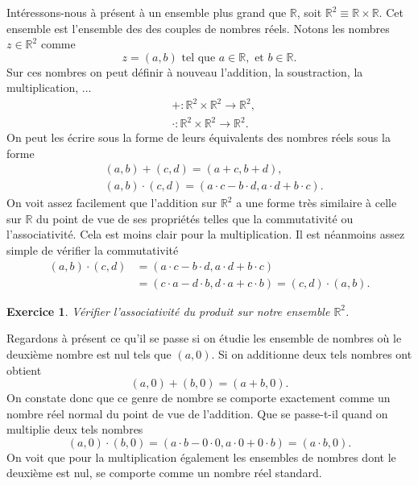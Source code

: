 \documentclass[a4paper,12pt]{book}
\newcommand{\real}{\mathbb{R}}
\newtheorem*{exercice}{Exercice}
\begin{document}
Intéressons-nous à présent à un ensemble plus grand que $\real$, soit $\real^2\equiv\real\times\real$. Cet ensemble est l'ensemble des
des couples de nombres réels. Notons les nombres $z\in\real^2$ comme 
\begin{equation}
 z=(a,b)\mbox{ tel que } a\in\real, \mbox{ et } b\in\real.
\end{equation}
Sur ces nombres on peut définir à nouveau l'addition, la soustraction, la multiplication, ...
\begin{align}
& +:\real^2\times\real^2\rightarrow\real^2,\\
& \cdot:\real^2\times\real^2\rightarrow\real^2.
\end{align}
On peut les écrire sous la forme de leurs équivalents des nombres réels sous la forme
\begin{align}
&(a,b)+(c,d)=(a+c,b+d),\label{eq_add}\\
&(a,b)\cdot(c,d)=(a\cdot c-b\cdot d,a\cdot d+b\cdot c).\label{eq_mult}
\end{align}
On voit assez facilement que l'addition sur $\real^2$ a une forme très similaire 
à celle sur $\real$ du point de vue de ses propriétés telles que la commutativité ou l'associativité.
Cela est moins clair pour la multiplication. Il est néanmoins assez simple de vérifier la commutativité
\begin{align}
(a,b)\cdot(c,d)&=(a\cdot c-b\cdot d,a\cdot d+b\cdot c)\nonumber\\
&=(c\cdot a-d\cdot b,d\cdot a+c\cdot b)=(c,d)\cdot (a,b).
\end{align}
\begin{exercice}
 Vérifier l'associativité du produit sur notre ensemble $\real^2$.
\end{exercice}
Regardons à présent ce qu'il se passe si on étudie les ensemble de nombres où le deuxième nombre est nul
tels que $(a,0)$. Si on additionne deux tels nombres ont obtient
\begin{equation}
 (a,0)+(b,0)=(a+b,0).
\end{equation}On constate donc que ce genre de nombre se comporte exactement comme un nombre réel normal du point de vue de l'addition.
Que se passe-t-il quand on multiplie deux tels nombres
\begin{equation}
 (a,0)\cdot(b,0)=(a\cdot b-0\cdot 0,a\cdot 0+0\cdot b)=(a\cdot b,0).
\end{equation}
On voit que pour la multiplication également les ensembles de nombres dont le deuxième est nul, se comporte comme un nombre réel standard.
\end{document}
